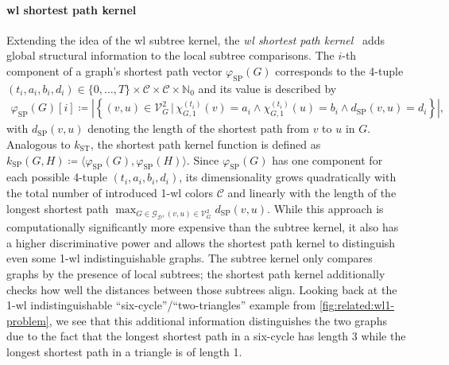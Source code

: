 \paragraph{\ac{wl} shortest path kernel}
Extending the idea of the \ac{wl} subtree kernel, the \textit{\ac{wl} shortest path kernel}~\cite{Shervashidze2011}\cite{Borgwardt2005} adds global structural information to the local subtree comparisons.
The $i$-th component of a graph's shortest path vector $\varphi_{\mathrm{SP}}(G)$ corresponds to the 4-tuple $(t_i, a_i, b_i, d_i) \in {\{ 0, \dots, T \}} \times \mathcal{C} \times \mathcal{C} \times \mathbb{N}_0$ and its value is described by
\begin{align}
	{\varphi_{\mathrm{SP}}(G)}[i] \coloneqq \left| \left\{ (v, u) \in \mathcal{V}_G^2 \,|\, {\chi_{G,1}^{(t_i)}(v) = a_i} \land {\chi_{G,1}^{(t_i)}(u) = b_i} \land {d_{\mathrm{SP}}(v, u) = d_i} \right\} \right| \text{,} \label{eq:related:wl-shortest-path-kernel} %
\end{align}
with $d_{\mathrm{SP}}(v, u)$ denoting the length of the shortest path from $v$ to $u$ in $G$.
Analogous to $k_{\mathrm{ST}}$, the shortest path kernel function is defined as $k_{\mathrm{SP}}(G, H) \coloneqq \langle \varphi_{\mathrm{SP}}(G), \varphi_{\mathrm{SP}}(H) \rangle$.
Since $\varphi_{\mathrm{SP}}(G)$ has one component for each possible 4-tuple $(t_i, a_i, b_i, d_i)$, its dimensionality grows quadratically with the total number of introduced 1-\acs{wl} colors $\mathcal{C}$ and linearly with the length of the longest shortest path $\max_{G \in \mathcal{G}_{\mathcal{D}}, (v, u) \in \mathcal{V}_G^2} d_{\mathrm{SP}}(v, u)$.
While this approach is computationally significantly more expensive than the subtree kernel, it also has a higher discriminative power and allows the shortest path kernel to distinguish even some 1-\acs{wl} indistinguishable graphs.
The subtree kernel only compares graphs by the presence of local subtrees;
the shortest path kernel additionally checks how well the distances between those subtrees align.
Looking back at the 1-\acs{wl} indistinguishable ``six-cycle''/``two-triangles'' example from \cref{fig:related:wl1-problem}, we see that this additional information distinguishes the two graphs due to the fact that the longest shortest path in a six-cycle has length 3 while the longest shortest path in a triangle is of length 1.

